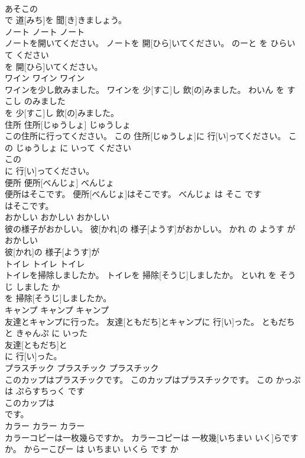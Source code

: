 \documentclass[8pt]{extreport}
\begin{document}
\begin{CJK}{UTF8}{min}
\\	あそこの
\\	で 道[みち]を 聞[き]きましょう。			
\\	ノート	ノート	ノート	
\\	ノートを開いてください。	ノートを 開[ひら]いてください。	のーと を ひらいて ください	
\\	を 開[ひら]いてください。			
\\	ワイン	ワイン	ワイン	
\\	ワインを少し飲みました。	ワインを 少[すこ]し 飲[の]みました。	わいん を すこし のみました	
\\	を 少[すこ]し 飲[の]みました。			
\\	住所	住所[じゅうしょ]	じゅうしょ	
\\	この住所に行ってください。	この 住所[じゅうしょ]に 行[い]ってください。	この じゅうしょ に いって ください	
\\	この
\\	に 行[い]ってください。			
\\	便所	便所[べんじょ]	べんじょ	
\\	便所はそこです。	便所[べんじょ]はそこです。	べんじょ は そこ です	
\\	はそこです。			
\\	おかしい	おかしい	おかしい	
\\	彼の様子がおかしい。	彼[かれ]の 様子[ようす]がおかしい。	かれ の ようす が おかしい	
\\	彼[かれ]の 様子[ようす]が
\\	トイレ	トイレ	トイレ	
\\	トイレを掃除しましたか。	トイレを 掃除[そうじ]しましたか。	といれ を そうじ しました か	
\\	を 掃除[そうじ]しましたか。			
\\	キャンプ	キャンプ	キャンプ	
\\	友達とキャンプに行った。	友達[ともだち]とキャンプに 行[い]った。	ともだち と きゃんぷ に いった	
\\	友達[ともだち]と
\\	に 行[い]った。			
\\	プラスチック	プラスチック	プラスチック	
\\	このカップはプラスチックです。	このカップはプラスチックです。	この かっぷ は ぷらすちっく です	
\\	このカップは
\\	です。			
\\	カラー	カラー	カラー	
\\	カラーコピーは一枚幾らですか。	カラーコピーは 一枚幾[いちまい いく]らですか。	からーこぴー は いちまい いくら です か	

\end{CJK}
\end{document}
